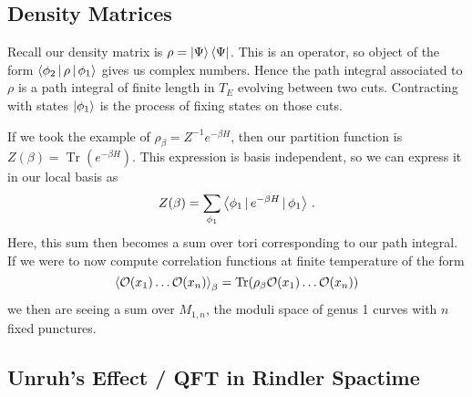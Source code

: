 \documentclass{article}
\begin{document}
\subsection{Density Matrices}
Recall our density matrix is $\rho = \ket{\Psi} \bra{\Psi}$. This is an operator, so object of the form $\left\langle \phi_2 \, | \, \rho \, | \, \phi_1 \right\rangle$ gives us complex numbers. Hence the path integral associated to $\rho$ is a path integral of finite length in $T_E$ evolving between two cuts. Contracting with states $\ket{\phi_1}$ is the process of fixing states on those cuts.
\begin{example}
If we took the example of $\rho_\beta = Z^{-1} e^{-\beta H}$, then our partition function is $Z(\beta) = \operatorname{Tr}(e^{-\beta H})$. This expression is basis independent, so we can express it in our local basis as 
\[
Z(\beta) = \sum_{\phi_1} \left\langle \phi_1 \, | \, e^{-\beta H} \, | \, \phi_1 \right\rangle \, . 
\]
Here, this sum then becomes a sum over tori corresponding to our path integral. If we were to now compute correlation functions at finite temperature of the form 
\[
\left\langle \mathcal{O}(x_1) \dots \mathcal{O}(x_n) \right\rangle_\beta = \operatorname{Tr}(\rho_\beta \mathcal{O}(x_1) \dots \mathcal{O}(x_n))
\]
we then are seeing a sum over $M_{1,n}$, the moduli space of genus 1 curves with $n$ fixed punctures. 
\end{example}

\subsection{Unruh's Effect / QFT in Rindler Spactime}
\end{document}
